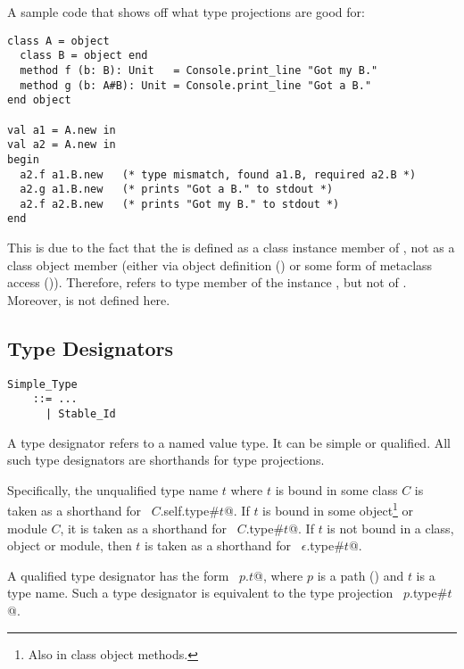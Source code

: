 \example A sample code that shows off what type projections are good for:
\begin{lstlisting}
class A = object
  class B = object end
  method f (b: B): Unit   = Console.print_line "Got my B."
  method g (b: A#B): Unit = Console.print_line "Got a B."
end object

val a1 = A.new in
val a2 = A.new in
begin
  a2.f a1.B.new   (* type mismatch, found a1.B, required a2.B *)
  a2.g a1.B.new   (* prints "Got a B." to stdout *)
  a2.f a2.B.new   (* prints "Got my B." to stdout *)
end
\end{lstlisting}
This is due to the fact that the  is defined as a class instance member of , not as a class object member (either via object definition () or some form of metaclass access ()). Therefore,  refers to type member  of the instance , but not of . Moreover,  is not defined here. 







\subsection{Type Designators}
\label{sec:type-designators}

\grammar\begin{lstlisting}
Simple_Type 
    ::= ...
      | Stable_Id
\end{lstlisting}

A type designator refers to a named value type. It can be simple or qualified. All such type designators are shorthands for type projections. 

Specifically, the unqualified type name $t$ where $t$ is bound in some class $C$ is taken as a shorthand for ~\lstinline@$C$.self.type#$t$@. If $t$ is bound in some object\footnote{Also in class object methods.} or module $C$, it is taken as a shorthand for ~\lstinline@$C$.type#$t$@. If $t$ is not bound in a class, object or module, then $t$ is taken as a shorthand for ~\lstinline@$\epsilon$.type#$t$@. 

A qualified type designator has the form ~\lstinline@$p$.$t$@, where $p$ is a path () and $t$ is a type name. Such a type designator is equivalent to the type projection ~\lstinline@$p$.type#$t$@. 

